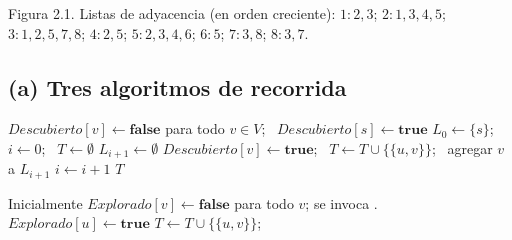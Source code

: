 \begin{center}

\small Figura 2.1. Listas de adyacencia (en orden creciente):
$1\!:\!2,3$;\; $2\!:\!1,3,4,5$;\; $3\!:\!1,2,5,7,8$;\; $4\!:\!2,5$;\; $5\!:\!2,3,4,6$;\; $6\!:\!5$;\; $7\!:\!3,8$;\; $8\!:\!3,7$.
\end{center}

\subsection*{(a) Tres algoritmos de recorrida}

\begin{algorithm}[H]
\caption{BFS (búsqueda en anchura, por capas)}
\begin{algorithmic}[1]
  \State $Descubierto[v]\gets\textbf{false}$ para todo $v\in V$; \ $Descubierto[s]\gets\textbf{true}$
  \State $L_0\gets\{s\}$; \ $i\gets 0$; \ $T\gets\emptyset$
    \State $L_{i+1}\gets\emptyset$
          \State $Descubierto[v]\gets\textbf{true}$; \ $T\gets T\cup\{\{u,v\}\}$; \ agregar $v$ a $L_{i+1}$
        \EndIf
      \EndFor
    \EndFor
    \State $i\gets i+1$
  \EndWhile
  \State \Return $T$
\EndFunction
\end{algorithmic}
\end{algorithm}

\begin{algorithm}[H]
\caption{DFS recursivo (búsqueda en profundidad)}
\begin{algorithmic}[1]
\State Inicialmente $Explorado[v]\gets\textbf{false}$ para todo $v$; se invoca .
  \State $Explorado[u]\gets\textbf{true}$
      \State $T\gets T\cup\{\{u,v\}\}$; \ 
    \EndIf
  \EndFor
\EndFunction
\end{algorithmic}
\end{algorithm}


